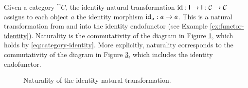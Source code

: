 \begin{example}
  \label{ex:natural-identity}

  Given a category $\cat{C}$, the identity natural transformation
  $\operatorname{id}: \mathsf{I} \to \mathsf{I}: \mathcal{C} \to \mathcal{C}$ assigns to each
  object $a$ the identity morphism $\operatorname{id}_{a}: a \to a$. This is a
  natural transformation from and into the identity endofunctor (see
  Example \ref{ex:functor-identity}). Naturality is the commutativity
  of the diagram in Figure \ref{fig:natural-identity}, which holds by
  \eqref{eq:category-identity}. More explicitly, naturality
  corresponds to the commutativity of the diagram in Figure
  \ref{fig:natural-identity-explicit}, which includes the identity
  endofunctor.

  \begin{figure}[htb]
    \begin{center}
      \begin{subfigure}[t]{0.45\linewidth}
        \begin{center}
        \end{center}
        \caption{}
        \label{fig:natural-identity}
      \end{subfigure}
      \begin{subfigure}[t]{0.45\linewidth}
        \begin{center}
        \end{center}
        \caption{}
        \label{fig:natural-identity-explicit}
      \end{subfigure}
    \end{center}
    \caption{Naturality of the identity natural transformation.}
  \end{figure}

\end{example}

